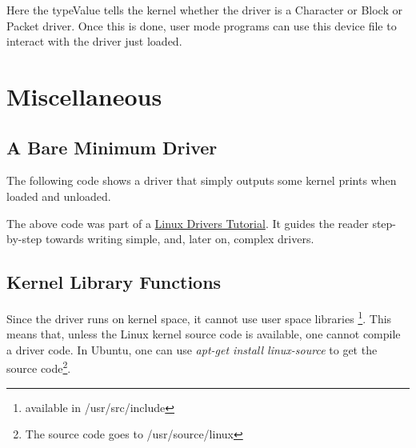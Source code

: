 Here the typeValue tells the kernel whether the driver is a Character or Block or Packet driver. Once this is done, user mode programs can use this device file to interact with the driver just loaded.

\section{Miscellaneous}
\subsection{A Bare Minimum Driver}
The following code shows a driver that simply outputs some kernel prints when loaded and unloaded.
	
The above code was part of a \href{http://opensourceforu.efytimes.com/2010/11/understanding-linux-device-drivers/}{Linux Drivers Tutorial}. It guides the reader step-by-step towards writing simple, and, later on, complex drivers.

\subsection{Kernel Library Functions}
Since the driver runs on kernel space, it cannot use user space libraries \footnote{available in /usr/src/include}. This means that, unless the Linux kernel source code is available, one cannot compile a driver code. In Ubuntu, one can use \emph{apt-get install linux-source} to get the source code\footnote{The source code goes to /usr/source/linux}.





